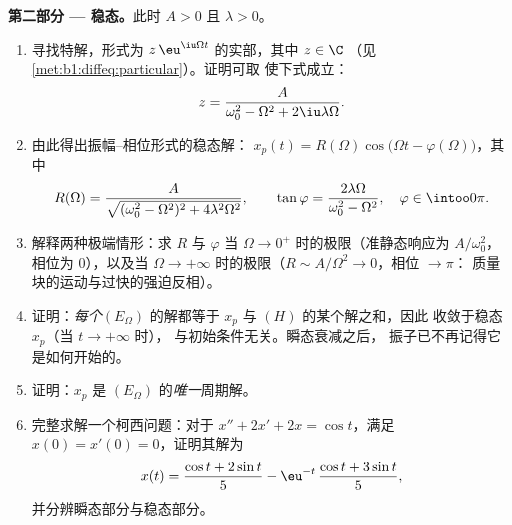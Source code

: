 \begin{problem}
\medskip
\noindent\textbf{第二部分 --- 稳态。}此时 $A > 0$ 且
$\lambda > 0$。
\begin{enumerate}[resume]
  \item 寻找特解，形式为
        $z\,\eu^{\iu\Omega t}$ 的实部，其中 $z \in \C$
        （见\cref{met:b1:diffeq:particular}）。证明可取
        使下式成立：
        \[
        z = \frac{A}{\omega_0^2 - \Omega^2 + 2\iu\lambda\Omega} .
        \]
  \item 由此得出振幅--相位形式的稳态解：
        $x_p(t) = R(\Omega)\cos\bigl(\Omega t -
        \varphi(\Omega)\bigr)$，其中
        \[
        R(\Omega) = \frac{A}{\sqrt{(\omega_0^2 - \Omega^2)^2 +
        4\lambda^2\Omega^2}},
        \qquad
        \tan\varphi = \frac{2\lambda\Omega}{\omega_0^2 -
        \Omega^2},
        \quad \varphi \in \intoo0\pi .
        \]
  \item 解释两种极端情形：求
        $R$ 与 $\varphi$ 当 $\Omega \to 0^+$ 时的极限（准静态响应为
        $A/\omega_0^2$，相位为 $0$），以及当 $\Omega \to
        +\infty$ 时的极限（$R \sim A/\Omega^2 \to 0$，相位 $\to \pi$：
        质量块的运动与过快的强迫反相）。
  \item 证明：\emph{每个}$(E_\Omega)$ 的解都等于 $x_p$
        与 $(H)$ 的某个解之和，因此
        收敛于稳态 $x_p$（当 $t \to +\infty$ 时），
        与初始条件无关。瞬态衰减之后，
        振子已不再记得它是如何开始的。
  \item 证明：$x_p$ 是
        $(E_\Omega)$ 的\emph{唯一}周期解。
  \item 完整求解一个柯西问题：对于 $x'' + 2x' + 2x =
        \cos t$，满足 $x(0) = x'(0) = 0$，证明其解为
        \[
        x(t) = \frac{\cos t + 2\sin t}5
        - \eu^{-t}\,\frac{\cos t + 3\sin t}5 ,
        \]
        并分辨瞬态部分与稳态部分。
\end{enumerate}


\end{problem}
